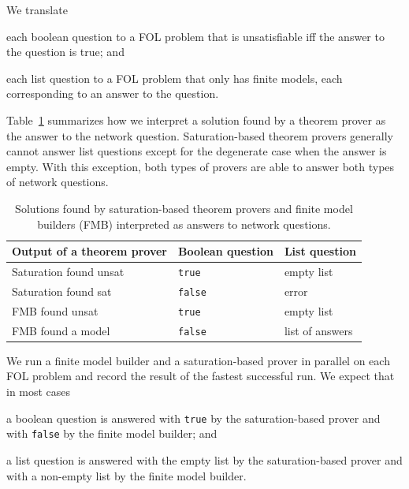 We translate
\begin{enumerate*}[label=(\roman*)]
  \item each boolean question to a FOL problem that is unsatisfiable iff the answer to the question is true; and
  \item each list question to a FOL problem that only has finite models, each corresponding to an answer to the question. 
\end{enumerate*}
Table~\ref{fig:fol-answering-questions} summarizes how we interpret a solution found by a theorem prover as the answer to the network question. Saturation-based theorem provers generally cannot answer list questions except for the degenerate case when the answer is empty. With this exception, both types of provers are able to answer both types of network questions. 

\begin{table}
  \center
  \begin{tabular}{lll}
    \hline
    Output of a theorem prover & Boolean question & List question \\
    \hline
    Saturation found unsat & \texttt{true}  & empty list \\
    Saturation found sat   & \texttt{false} & error \\
    FMB found unsat        & \texttt{true}  & empty list \\
    FMB found a model      & \texttt{false} & list of answers \\
  \end{tabular}
  \caption{Solutions found by saturation-based theorem provers and finite model builders (FMB) interpreted as answers to network questions.}
  \label{fig:fol-answering-questions}
\end{table}


We run a finite model builder and a saturation-based prover in parallel on each FOL problem and record the result of the fastest successful run. We expect that in most cases
\begin{enumerate*}[label=(\roman*)]
  \item a boolean question is answered with \verb'true' by the saturation-based prover and with \verb'false' by the finite model builder; and
  \item a list question is answered with the empty list by the saturation-based prover and with a non-empty list by the finite model builder.
\end{enumerate*}

